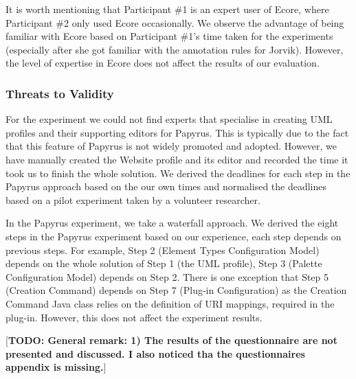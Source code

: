 It is worth mentioning that Participant \#1 is an expert user of Ecore, where Participant \#2 only used Ecore occasionally. 
We observe the advantage of being familiar with Ecore based on Participant \#1's time taken for the experiments (especially after she got familiar with the annotation rules for Jorvik).
However, the level of expertise in Ecore does not affect the results of our evaluation.


\subsubsection{Threats to Validity}
For the experiment we could not find experts that specialise in creating UML profiles and their supporting editors for Papyrus. 
This is typically due to the fact that this feature of Papyrus is not widely promoted and adopted.
However, we have manually created the Website profile and its editor and recorded the time it took us to finish the whole solution. 
We derived the deadlines for each step in the Papyrus approach based on the our own times and normalised the deadlines based on a pilot experiment taken by a volunteer researcher.

In the Papyrus experiment, we take a waterfall approach.
We derived the eight steps in the Papyrus experiment based on our experience, each step depends on previous steps. 
For example, Step 2 (Element Types Configuration Model) depends on the whole solution of Step 1 (the UML profile), Step 3 (Palette Configuration Model) depends on Step 2. 
There is one exception that Step 5 (Creation Command) depends on Step 7 (Plug-in Configuration) as the Creation Command Java class relies on the definition of URI mappings, required in the plug-in. 
However, this does not affect the experiment results.



[\textbf{TODO: General remark: 1) The results of the questionnaire are not presented and discussed. I also noticed tha the questionnaires appendix is missing.}]
